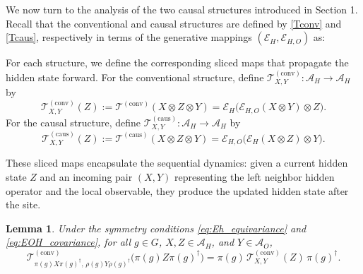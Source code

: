 \documentclass[12pt,a4paper]{article}
\newtheorem{lemma}[theorem]{Lemma}
\begin{document}
We now turn to the analysis of the two causal structures introduced in Section 1. Recall that the conventional and causal structures are defined by \eqref{Tconv} and \eqref{Tcaus}, respectively in terms of the generative mappings \((\mathcal{E}_H, \mathcal{E}_{H,O})\) as:


For each structure, we define the corresponding sliced maps that propagate the hidden state forward. For the conventional structure, define \(\mathcal{T}_{X,Y}^{(\text{conv})}: \mathcal{A}_H \to \mathcal{A}_H\) by
\begin{equation}
\mathcal{T}_{X,Y}^{(\text{conv})}(Z) := \mathcal{T}^{(\text{conv})}(X \otimes Z \otimes Y) = \mathcal{E}_H\big( \mathcal{E}_{H,O}(X \otimes Y) \otimes Z \big).
\label{eq:conv_sliced}
\end{equation}
For the causal structure, define \(\mathcal{T}_{X,Y}^{(\text{caus})}: \mathcal{A}_H \to \mathcal{A}_H\) by
\begin{equation}
\mathcal{T}_{X,Y}^{(\text{caus})}(Z) := \mathcal{T}^{(\text{caus})}(X \otimes Z \otimes Y) = \mathcal{E}_{H,O}\big( \mathcal{E}_H(X \otimes Z) \otimes Y \big).
\label{eq:caus_sliced}
\end{equation}

These sliced maps encapsulate the sequential dynamics: given a current hidden state \(Z\) and an incoming pair \((X,Y)\) representing the left neighbor hidden operator and the local observable, they produce the updated hidden state after the site.

\begin{lemma}\label{lem:conv_cov}
Under the symmetry conditions \eqref{eq:Eh_equivariance} and \eqref{eq:EOH_covariance}, for all \(g \in G\), \(X, Z \in \mathcal{A}_H\), and \(Y \in \mathcal{A}_O\),
\begin{equation}
\mathcal{T}_{\pi(g) X \pi(g)^\dagger, \, \rho(g) Y \rho(g)^\dagger}^{(\text{conv})}\big( \pi(g) Z \pi(g)^\dagger \big) = \pi(g) \, \mathcal{T}_{X,Y}^{(\text{conv})}(Z) \, \pi(g)^\dagger.
\label{eq:conv_covariance}
\end{equation}
\end{lemma}
\end{document}
